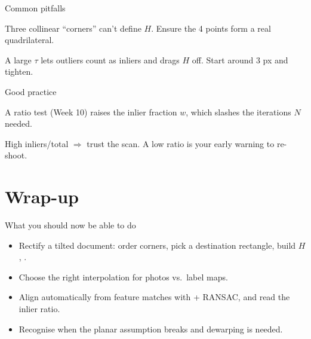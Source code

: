 \documentclass[10pt,aspectratio=169]{beamer}
\begin{document}
\begin{frame}{Common pitfalls}
  \begin{badbox}
    Three collinear ``corners'' can't define $H$. Ensure the 4 points form a real quadrilateral.
  \end{badbox}
  \begin{badbox}
    A large $\tau$ lets outliers count as inliers and drags $H$ off. Start around 3 px and tighten.
  \end{badbox}
\end{frame}

\begin{frame}{Good practice}
  \begin{goodbox}
    A ratio test (Week 10) raises the inlier fraction $w$, which slashes the iterations $N$ needed.
  \end{goodbox}
  \begin{goodbox}
    High inliers/total $\Rightarrow$ trust the scan. A low ratio is your early warning to re-shoot.
  \end{goodbox}
\end{frame}

\section{Wrap-up}

\begin{frame}{What you should now be able to do}
  \begin{itemize}
    \item Rectify a tilted document: order corners, pick a destination rectangle, build $H$, .
    \item Choose the right interpolation for photos vs.\ label maps.
    \item Align automatically from feature matches with  + RANSAC, and read the inlier ratio.
    \item Recognise when the planar assumption breaks and dewarping is needed.
  \end{itemize}
\end{frame}
\end{document}

